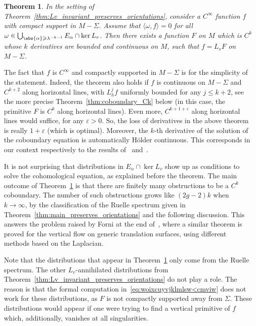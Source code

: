 \documentclass[11pt, a4paper, oneside, final, pagebackref]{amsart}
\renewcommand{\epsilon}{\varepsilon}
\renewcommand{\leq}{\leqslant}
\renewcommand{\geq}{\geqslant}
\newtheorem{thm}{Theorem}[section]
\theoremstyle{definition}
\numberwithin{equation}{section}
\begin{document}
\begin{thm}
\label{thm:coboundary_Ck_main} In the setting of
Theorem~\ref{thm:Lv_invariant_preserves_orientations}, consider a $C^\infty$
function $f$ with compact support in $M-\Sigma$. Assume that $\langle \omega,
f\rangle = 0$ for all $\omega \in \bigcup_{\abs{\alpha} \geq \lambda^{-k-1}}
E_\alpha \cap \ker L_v$. Then there exists a function $F$ on $M$ which is
$C^k$ whose $k$ derivatives are bounded and continuous on $M$, such that $f =
L_v F$ on $M-\Sigma$.
\end{thm}
The fact that $f$ is $C^\infty$ and compactly supported in $M-\Sigma$ is for
the simplicity of the statement. Indeed, the theorem also holds if $f$ is
continuous on $M-\Sigma$ and $C^{k+2}$ along horizontal lines, with $L_h^j f$
uniformly bounded for any $j \leq k+2$, see the more precise
Theorem~\ref{thm:coboundary_Ck} below (in this case, the primitive $F$ is
$C^k$ along horizontal lines). Even more, $C^{k+1+\epsilon}$ along horizontal
lines would suffice, for any $\epsilon>0$. So, the loss of derivatives in the
above theorem is really $1+\epsilon$ (which is optimal). Moreover, the $k$-th
derivative of the solution of the coboundary equation is automatically H\"older
continuous. This corresponds in our context respectively to the results
of~\cite{forni_regularity} and~\cite{marmi_yoccoz_Holder}.

It is not surprising that distributions in $E_\alpha \cap \ker L_v$ show up
as conditions to solve the cohomological equation, as explained before the
theorem. The main outcome of Theorem~\ref{thm:coboundary_Ck_main} is that
there are finitely many obstructions to be a $C^k$ coboundary. The number of
such obstructions grows like $(2g-2)k$ when $k\to \infty$, by the
classification of the Ruelle spectrum given in
Theorem~\ref{thm:main_preserves_orientations} and the following discussion.
This answers the problem raised by Forni at the end
of~\cite{forni_cohomological}, where a similar theorem is proved for the
vertical flow on generic translation surfaces, using different methods based
on the Laplacian.

Note that the distributions that appear in
Theorem~\ref{thm:coboundary_Ck_main} only come from the Ruelle spectrum. The
other $L_v$-annihilated distributions from
Theorem~\ref{thm:Lv_invariant_preserves_orientations} do not play a role. The
reason is that the formal computation in~\eqref{eq:woixcuyvjklmlsw<cmviw}
does not work for these distributions, as $F$ is not compactly supported away
from $\Sigma$. These distributions would appear if one were trying to find a
vertical primitive of $f$ which, additionally, vanishes at all singularities.
\end{document}
